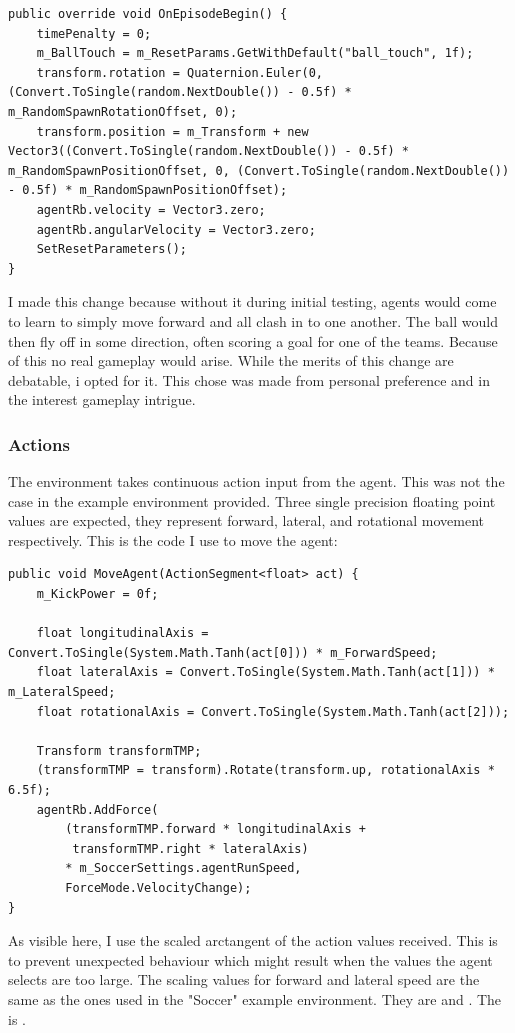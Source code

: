 \begin{lstlisting}[basicstyle=\footnotesize]
public override void OnEpisodeBegin() {
    timePenalty = 0;
    m_BallTouch = m_ResetParams.GetWithDefault("ball_touch", 1f);
    transform.rotation = Quaternion.Euler(0, (Convert.ToSingle(random.NextDouble()) - 0.5f) * m_RandomSpawnRotationOffset, 0);
    transform.position = m_Transform + new Vector3((Convert.ToSingle(random.NextDouble()) - 0.5f) * m_RandomSpawnPositionOffset, 0, (Convert.ToSingle(random.NextDouble()) - 0.5f) * m_RandomSpawnPositionOffset);
    agentRb.velocity = Vector3.zero;
    agentRb.angularVelocity = Vector3.zero;
    SetResetParameters();
}
\end{lstlisting}
I made this change because without it during initial testing, agents would come to learn to simply move forward and all clash in to one another. The ball would then fly off in some direction, often scoring a goal for one of the teams. Because of this no real gameplay would arise. While the merits of this change are debatable, i opted for it. This chose was made from personal preference and in the interest gameplay intrigue.

\subsubsection{Actions}\label{subsubsec:ip:environment:impl:actions}
The environment takes continuous action input from the agent. This was not the case in the example environment provided. Three single precision floating point values are expected, they represent forward, lateral, and rotational movement respectively. This is the  code I use to move the agent:

\begin{lstlisting}[basicstyle=\footnotesize]
public void MoveAgent(ActionSegment<float> act) {
    m_KickPower = 0f;

    float longitudinalAxis = Convert.ToSingle(System.Math.Tanh(act[0])) * m_ForwardSpeed;
    float lateralAxis = Convert.ToSingle(System.Math.Tanh(act[1])) * m_LateralSpeed;
    float rotationalAxis = Convert.ToSingle(System.Math.Tanh(act[2]));

    Transform transformTMP;
    (transformTMP = transform).Rotate(transform.up, rotationalAxis * 6.5f);
    agentRb.AddForce(
        (transformTMP.forward * longitudinalAxis +
         transformTMP.right * lateralAxis)
        * m_SoccerSettings.agentRunSpeed,
        ForceMode.VelocityChange);
}
\end{lstlisting}
\noindent
As visible here, I use the scaled arctangent of the action values received. This is to prevent unexpected behaviour which might result when the values the agent selects are too large. The scaling values for forward and lateral speed are the same as the ones used in the "Soccer" example environment. They are  and . The  is .

